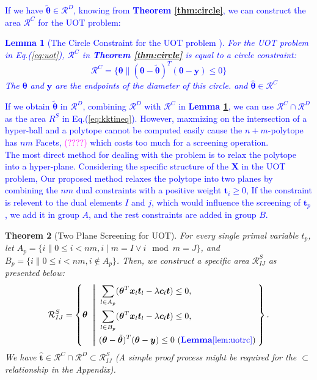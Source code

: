 \documentclass[twoside]{article}
\theoremstyle{plain}
\newtheorem{thm}{Theorem}
\newtheorem{lem}[thm]{Lemma}
\newcommand{\tranT}{T}
\newcommand{\mat}[1]{\mathbf{#1}}
\renewcommand{\vec}[1]{\bm{#1}}
\newcommand{\changeXS}[1]{\textcolor{blue}{#1}}
\newcommand{\note}[1]{\textcolor{magenta}{#1}}
\begin{document}
\changeXS{If we have $\tilde{\vec{\theta}} \in \mathcal{R}^{D}$, knowing from {\bf Theorem \ref{thm:circle}}, we can construct the area $\mathcal{R}^{C}$ for the UOT problem:
\begin{lem}[The Circle Constraint for the UOT problem {\citep[Theorem 8]{NEURIPS2021_7b5b23f4}}]
\label{lem:uotrc}
For the UOT problem in Eq.(\ref{eq:uot}), $\mathcal{R}^{C}$ in {\bf Theorem \ref{thm:circle}} is equal to a circle constraint:
\begin{equation}
\mathcal{R}^{C} =\{\vec\theta\|(\vec{\theta}-\tilde{\vec{\theta}})^{\tranT}(\vec{\theta}-\vec{y})\leq 0\}
\label{eq:uotcircle}
\end{equation}
The $\vec\theta$ and $\vec y$ are the endpoints of the diameter of this circle. and $\hat{ \vec\theta} \in \mathcal{R}^{C}$
\end{lem}
If we obtain $\tilde{\vec{\theta}}$ in $\mathcal{R}^{D}$, combining $\mathcal{R}^{D}$ with $\mathcal{R}^{C}$ in {\bf Lemma \ref{lem:uotrc}}, we can use $\mathcal{R}^{C}\cap\mathcal{R}^{D}$ as the area $R^{S}$ in Eq.(\ref{eq:kktineq}). However, maxmizing on the intersection of a hyper-ball and a polytope cannot be computed easily cause the $n+m$-polytope has $nm$ Facets, \note{(????)} which costs too much for a screening operation.\\
The most direct method for dealing with the problem is to relax the polytope into a hyper-plane. Considering the specific structure of the $\mat X$ in the UOT problem, Our proposed method relaxes the polytope into two planes by combining the $nm$ dual constraints with a positive weight $\vec t_i \geq 0$, If the constraint is relevent to the dual elements $I$ and $j$, which would influence the screening of $\vec t_p$, we add it in group $A$, and the rest constraints are added in group $B$.}

\begin{thm}[Two Plane Screening for UOT]
\label{Thm:AreaScreeningUOT}
For every single primal variable $t_p$, let $A_p = \{ i \| 0\leq i<nm, i\mid m = I \vee i\mod m = J\}$, and $B_p = \{ i \| 0\leq i<nm, i \notin A_p\}$. Then, we construct a specific area $\mathcal{R}^{S}_{IJ}$ as presented below:
 \begin{equation}
\begin{split} 
\mathcal{R}^S_{IJ} = \left\{\vec{\theta} \ \left|\!\left| \ 
\begin{aligned}
 &\sum_{l\in A_p}(\vec{\theta}^{\tranT}\vec{x}_{l}\vec{t}_l - \lambda \vec{c}_l \vec{t})\leq 0, \\
 &\sum_{l\in B_p}(\vec{\theta}^{\tranT}\vec{x}_{l}\vec{t}_l - \lambda \vec{c}_l \vec{t})\leq 0, \\
  &(\vec{\theta}-\tilde{\vec{\theta}})^{\tranT}(\vec{\theta}-\vec{y})\leq 0 \ (\changeXS{\bf Lemma  \ref{lem:uotrc}})
\end{aligned}
\right.\right.
\right\}.
\end{split}
\label{eq:divide}
\end{equation}
We have $\hat{\vec{t}} \in \mathcal{R}^{C}\cap\mathcal{R}^{D} \subset \mathcal{R}^{S}_{IJ}$ (A simple proof process might be required for the $\subset$ relationship in the Appendix).
\end{thm}
\end{document}
